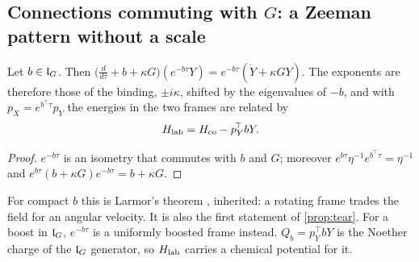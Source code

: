 \subsection{\texorpdfstring{Connections commuting with $G$: a Zeeman pattern without a scale}{Connections commuting with G: a Zeeman pattern without a scale}}
\label{sec:bf-commuting}

\begin{proposition}
\label{bf:larmor}
Let $b\in\mathfrak l_G$. Then $\bigl(\tfrac d{d\tau}+b+\kappa G\bigr)(e^{-b\tau}Y)=e^{-b\tau}(\dot Y+\kappa GY)$. The exponents are therefore those of the
binding, $\pm i\kappa$, shifted by the eigenvalues of $-b$, and with $p_X=e^{b^{\!\top}\tau}p_Y$ the energies in the two frames are related by
\[
H_{\rm lab}=H_{\rm co}-p_Y^{\!\top}bY.
\]
\end{proposition}

\begin{proof}
$e^{-b\tau}$ is an isometry that commutes with $b$ and $G$; moreover $e^{b\tau}\eta^{-1}e^{b^{\!\top}\tau}=\eta^{-1}$ and
$e^{b\tau}(b+\kappa G)e^{-b\tau}=b+\kappa G$.
\end{proof}

For compact $b$ this is Larmor's theorem \cite{Larmor1897}, inherited: a rotating frame trades the field for an angular velocity. It is also the
first statement of \cref{prop:tear}. For a boost in $\mathfrak l_G$, $e^{-b\tau}$ is a uniformly boosted frame instead. $Q_b=p_Y^{\!\top}bY$ is the Noether
charge of the $\mathfrak l_G$ generator, so $H_{\rm lab}$ carries a chemical potential for it.

